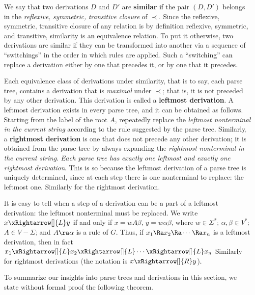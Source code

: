 \begin{multicols}{2}
\setlength{\columnsep}{1.5cm}
\setlength{\columnseprule}{0.2pt}
    
We say that two derivations $D$ and $D'$ are \textbf{similar} if the pair $(D, D')$ belongs in the \textit{reflexive, symmetric, transitive closure} of $\prec$. Since the reflexive, symmetric, transitive closure of any relation is by definition reflexive, symmetric, and transitive, similarity is an equivalence relation. To put it otherwise, two derivations are similar if they can be transformed into another via a sequence of ``switchings'' in the order in which rules are applied. Such a ``switching'' can replace a derivation either by one that precedes it, or by one that it precedes.

Each equivalence class of derivations under similarity, that is to say, each parse tree, contains a derivation that is \textit{maximal} under $\prec$; that is, it is not preceded by any other derivation. This derivation is called a \textbf{leftmost derivation}. A leftmost derivation exists in every parse tree, and it can be obtained as follows. Starting from the label of the root $A$, repeatedly replace the \textit{leftmost nonterminal in the current string} according to the rule suggested by the parse tree. Similarly, a \textbf{rightmost derivation} is one that does not precede any other derivation; it is obtained from the parse tree by always expanding the \textit{rightmost nonterminal in the current string}. \textit{Each parse tree has exactly one leftmost and exactly one rightmost derivation}. This is so because the leftmost derivation of a parse tree is uniquely determined, since at each step there is one nonterminal to replace: the leftmost one. Similarly for the rightmost derivation.

It is easy to tell when a step of a derivation can be a part of a leftmost derivation: the leftmost nonterminal must be replaced. We write $x \xRightarrow[]{L} y$ if and only if $x = wA\beta$, $y = w\alpha\beta$, where $w \in \Sigma^*$; $\alpha, \beta \in V^*$; $A \in V - \Sigma$; and $A \ra \alpha$ is a rule of $G$. Thus, if $x_1 \Ra x_2 \Ra \cdots \Ra x_n$ is a leftmost derivation, then in fact $x_1 \xRightarrow[]{L} x_2 \xRightarrow[]{L} \cdots \xRightarrow[]{L} x_n$ Similarly for rightmost derivations (the notation is $x \xRightarrow[]{R} y$).

To summarize our insights into parse trees and derivations in this section, we state without formal proof the following theorem.


\end{multicols}

